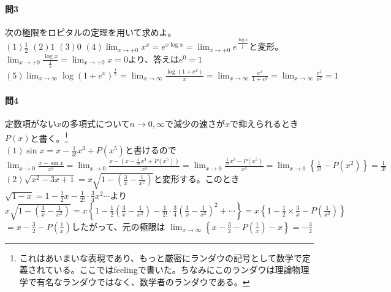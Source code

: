 \documentclass[a4j,dvipdfmx]{jsarticle}
\begin{document}
                \paragraph{問3}次の極限をロピタルの定理を用いて求めよ。\\
                $(1)\frac{1}{2}$\hspace{2mm}
                $(2)1$\hspace{2mm}
                $(3)0$\hspace{2mm}
                $\displaystyle(4)\lim_{x\to+0}x^x=e^{x\log x}=\lim_{x\to+0}e^{\frac{\log x}{\frac{1}{x}}}$と変形。$\displaystyle\lim_{x\to+0}\frac{\log x}{\frac{1}{x}}=\lim_{x\to+0}x=0$より、答えは$e^{0}=1$
                $\displaystyle(5)\lim_{x\to\infty}\log(1+e^x)^{\frac{1}{x}}=\lim_{x\to\infty}\frac{\log(1+e^x)}{x}=\lim_{x\to\infty}\frac{e^x}{1+e^x}=\lim_{x\to\infty}\frac{e^x}{e^x}=1$

                \paragraph{問4}定数項がない$x$の多項式について$n\to0,\infty$で減少の速さが$x$で抑えられるとき$P(x)$と書く。\footnote{これはあいまいな表現であり、もっと厳密にランダウの記号として数学で定義されている。ここではfeelingで書いた。ちなみにこのランダウは理論物理学で有名なランダウではなく、数学者のランダウである。}\\
                \vspace{1mm}$(1)$$\sin x=x-\frac{1}{3!}x^3+P(x^5)$と書けるので\\
                $\displaystyle\lim_{x\to 0}\frac{x-\sin x}{x^3}=\lim_{x\to 0}\frac{x-\left(x-\frac{1}{3!}x^3+P(x^5)\right)}{x^3}=\lim_{x\to 0}\frac{\frac{1}{3!}x^3-P(x^5)}{x^3}=\lim_{x\to 0}\left\{\frac{1}{3!}-P(x^2)\right\}=\frac{1}{3!}$\\
                \vspace{3mm}\noindent
                $(2)\displaystyle\sqrt{x^2-3x+1}=x\sqrt{1-\left(\frac{3}{x}-\frac{1}{x^2}\right)}$と変形する。このとき$\sqrt{1-x}=1-\frac{1}{2}x-\frac{1}{2!}\cdot\frac{3}{4}x^2\cdots$より\\
                $\displaystyle x\sqrt{1-\left(\frac{3}{x}-\frac{1}{x^2}\right)}=x\left\{1-\frac{1}{2}\left(\frac{3}{x}-\frac{1}{x^2}\right)-\frac{1}{2!}\cdot\frac{3}{4}\left(\frac{3}{x}-\frac{1}{x^2}\right)^2+\cdots\right\}=x\left\{1-\frac{1}{2}\times\frac{3}{x}-P\left(\frac{1}{x^2}\right)\right\}$\\
                $\displaystyle=x-\frac{3}{2}-P\left(\frac{1}{x}\right)$したがって、元の極限は
                $\displaystyle\lim_{x\to \infty}\left\{x-\frac{3}{2}-P\left(\frac{1}{x}\right)-x\right\}=-\frac{3}{2}$
\end{document}
